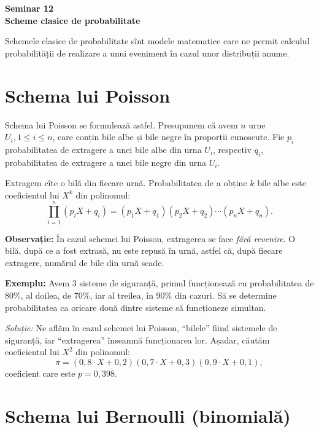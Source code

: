\documentclass[12pt,a4paper]{article}
\newcommand\qq{\enquote}
\theoremstyle{dotless}
\theoremstyle{dotlessdr}
\begin{document}
\begin{center}
  {\large\textbf{Seminar 12 \\
    Scheme clasice de probabilitate}}
\end{center}

\vspace{2cm}

\indent\indent
Schemele clasice de probabilitate sînt modele matematice care ne permit calculul
probabilității de realizare a unui eveniment în cazul unor distribuții anume.

\section*{Schema lui Poisson}

\indent\indent Schema lui Poisson se formulează astfel. Presupunem că avem $ n $
urne $ U_i, 1 \leq i \leq n $, care conțin bile albe și bile negre în proporții
cunoscute. Fie $ p_i $ probabilitatea de extragere a unei bile albe din urna $ U_i $,
respectiv $ q_i $, probabilitatea de extragere a unei bile negre din urna $ U_i $.

Extragem cîte o bilă din fiecare urnă. Probabilitatea de a obține $ k $ bile albe
este coeficientul lui $ X^k $ din polinomul:
\[
  \prod_{i = 1}^n (p_i X + q_i) = (p_1 X + q_1) (p_2 X + q_2) \cdots (p_n X + q_n).
\]

\textbf{Observație:} În cazul schemei lui Poisson, extragerea se face \emph{fără %
  revenire}. O bilă, după ce a fost extrasă, nu este repusă în urnă, astfel că, după
fiecare extragere, numărul de bile din urnă scade.

\vspace{1cm}

\textbf{Exemplu:} Avem 3 sisteme de siguranță, primul funcționează cu probabilitatea
de 80\%, al doilea, de 70\%, iar al treilea, în 90\% din cazuri. Să se determine
probabilitatea ca oricare două dintre sisteme să funcționeze simultan.

\emph{Soluție:} Ne aflăm în cazul schemei lui Poisson, \qq{bilele} fiind sistemele
de siguranță, iar \qq{extragerea} înseamnă funcționarea lor. Așadar, căutăm
coeficientul lui $ X^2 $ din polinomul:
\[
  \pi = (0,8 \cdot X + 0,2)(0,7 \cdot X + 0,3)(0,9 \cdot X + 0,1),
\]
coeficient care este $ p = 0,398 $.


\section*{Schema lui Bernoulli (binomială)}
\end{document}
